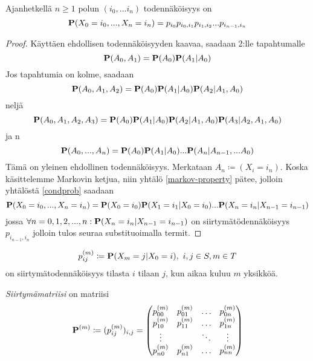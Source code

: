 \begin{lause}
	Ajanhetkellä $n\geq 1$ polun $(i_0,...i_n)$ todennäköisyys on 
	\begin{equation}
		\textbf{P} (X_0=i_0,...,X_n=i_n) = p_{i_0} p_{i_0,i_1} p_{i_1,i_2} ... p_{i_{n-1},i_n}
	\end{equation} 
\end{lause}
\begin{proof}
	Käyttäen ehdollisen todennäköisyyden kaavaa, saadaan 2:lle tapahtumalle
	\begin{equation*}
		\textbf{P} (A_0, A_1)=\textbf{P}(A_0)\textbf{P}(A_1|A_0)
	\end{equation*}
	Jos tapahtumia on kolme, saadaan
	\begin{equation*}
		\textbf{P} (A_0, A_1, A_2)=\textbf{P}(A_0)\textbf{P}(A_1|A_0)\textbf{P}(A_2|A_1, A_0)
	\end{equation*}
	neljä
	\begin{equation*}
		\textbf{P} (A_0, A_1, A_2, A_3)=\textbf{P}(A_0)\textbf{P}(A_1|A_0)\textbf{P}(A_2|A_1, A_0)\textbf{P}(A_3|A_2,A_1,A_0)
	\end{equation*}
	ja n
	\begin{equation}\label{condprob}
		\textbf{P} (A_0,...,A_n)=\textbf{P}(A_0)\textbf{P}(A_1|A_0)...\textbf{P}(A_n|A_{n-1},...A_0)
	\end{equation}
	Tämä on yleinen ehdollinen todennäköisyys. Merkataan $A_n \coloneqq (X_i=i_n)$. Koska käsittelemme Markovin ketjua, niin yhtälö \ref{markov-property} pätee, jolloin yhtälöstä \ref{condprob} saadaan 
	\begin{equation*}
		\textbf{P}(X_0=i_0,...,X_n=i_n) = \textbf{P}(X_0=i_0) \textbf{P}(X_1=i_1|X_0=i_0)...\textbf{P}(X_n=i_n|X_{n-1}=i_{n-1})
	\end{equation*}
	jossa $\forall n=0,1,2,...,n: \textbf{P}(X_n=i_n|X_{n-1}=i_{n-1})$ on siirtymätödennäköisyys $p_{i_{n-1},i_n}$ jolloin tulos seuraa substituoimalla termit.
\end{proof}

\begin{merk}
	\begin{equation}
		p_{ij}^{(m)} \coloneqq \textbf{P} (X_m=j|X_0=i),\ i,j\in S,m\in T
	\end{equation}
	on siirtymätodennäköisyys tilasta $i$ tilaan $j$, kun aikaa kuluu $m$ yksikköä.
\end{merk}

\begin{maar}
	\textit{Siirtymämatriisi} on matriisi
	\begin{equation}
		\textbf{P} ^{(m)} \coloneqq (p_{ij}^{(m)})_{i,j} =
		\begin{pmatrix}
			p_{00}^{(m)} & p_{01}^{(m)} & \dots & p_{0n}^{(m)} \\
			p_{10}^{(m)} & p_{11}^{(m)} & \dots & p_{1n}^{(m)} \\
			\vdots & & \ddots & \vdots \\
			p_{n0}^{(m)} & p_{n1}^{(m)} & \dots & p_{nn}^{(m)}
		\end{pmatrix}
	\end{equation}
\end{maar}

